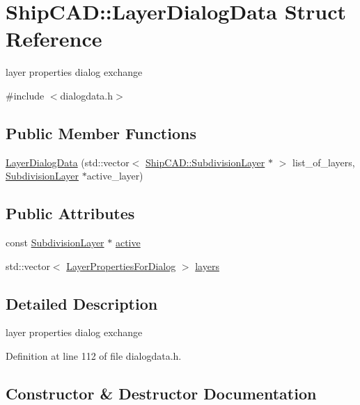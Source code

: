 \hypertarget{structShipCAD_1_1LayerDialogData}{}\section{Ship\+C\+AD\+:\+:Layer\+Dialog\+Data Struct Reference}
\label{structShipCAD_1_1LayerDialogData}


layer properties dialog exchange  




{\ttfamily \#include $<$dialogdata.\+h$>$}

\subsection*{Public Member Functions}
\begin{DoxyCompactItemize}
\item 
\hyperlink{structShipCAD_1_1LayerDialogData_a103bbd6fea98f88c5e2d150b950eb4dc}{Layer\+Dialog\+Data} (std\+::vector$<$ \hyperlink{classShipCAD_1_1SubdivisionLayer}{Ship\+C\+A\+D\+::\+Subdivision\+Layer} $\ast$ $>$ list\+\_\+of\+\_\+layers, \hyperlink{classShipCAD_1_1SubdivisionLayer}{Subdivision\+Layer} $\ast$active\+\_\+layer)
\end{DoxyCompactItemize}
\subsection*{Public Attributes}
\begin{DoxyCompactItemize}
\item 
const \hyperlink{classShipCAD_1_1SubdivisionLayer}{Subdivision\+Layer} $\ast$ \hyperlink{structShipCAD_1_1LayerDialogData_a1afb0b48ae0398225fc6b8f3207fb6fb}{active}
\item 
std\+::vector$<$ \hyperlink{structShipCAD_1_1LayerPropertiesForDialog}{Layer\+Properties\+For\+Dialog} $>$ \hyperlink{structShipCAD_1_1LayerDialogData_a9ba6f5373c88460d880811ad835d74f1}{layers}
\end{DoxyCompactItemize}


\subsection{Detailed Description}
layer properties dialog exchange 

Definition at line 112 of file dialogdata.\+h.



\subsection{Constructor \& Destructor Documentation}
